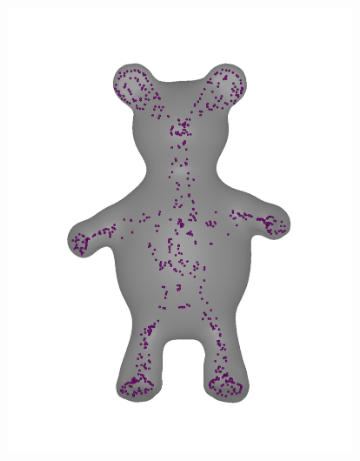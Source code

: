 \documentclass[annual]{acmsiggraph}
\begin{document}
\begin{figure}
\begin{subfigure}[b]{0.19\linewidth}
                \includegraphics[width=\textwidth]{images/bear/2.pdf}
        \end{subfigure}
~
		\begin{subfigure}[b]{0.19\linewidth}
                \centering

\end{subfigure}
\end{figure}
\end{document}
